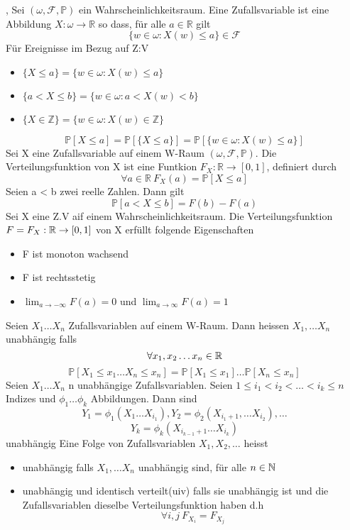 \sep
\Def[2.1 Zufallsvariable] \newline
Sei \( (\omega, \mathcal{F}, \mathbb{P})\) ein Wahrscheinlichkeitsraum. Eine Zufallsvariable ist eine Abbildung \( X : \omega \rightarrow \mathbb{R} \) so dass, für alle \( a \in \mathbb{R}\) gilt \[ \{ w \in \omega : X(w) \leq a \} \in \mathcal{F}\]
\Bem  \newline
Für Ereignisse im Bezug auf Z:V
\begin{itemize}
    \item \( \{X \leq a \} = \{ w \in \omega : X(w) \leq a\}\)
    \item \( \{ a < X \leq b \} = \{ w \in \omega : a < X(w) < b\}\)
    \item \( \{ X \in \mathbb{Z}\} = \{ w \in \omega : X(w) \in \mathbb{Z}\}\)
\end{itemize}
\[ \mathbb{P}[X \leq a] = \mathbb{P}[\{X \leq a\}] = \mathbb{P}[\{w \in \omega : X(w) \leq a\}]\]
\Def[2.2 Verteilungsfunktion] \newline
Sei X eine Zufallsvariable auf einem W-Raum \( (\omega, \mathcal{F}, \mathbb{P})\). Die Verteilungsfunktion von X ist eine Funtkion \(F_X : \mathbb{R} \rightarrow [0,1]\), definiert durch \[ \forall a \in \mathbb{R} \ F_X(a) = \mathbb{P}[X \leq a]\]
 \newline
Seien a < b zwei reelle Zahlen. Dann gilt \[ \mathbb{P}[a < X \leq b ] = F(b) - F(a)\]
 \newline
Sei X eine Z.V aif einem Wahrscheinlichkeitsraum. Die Verteilungsfunktion \( F = F_X : \mathbb{R} \rightarrow [0,1]\) von X erfüllt folgende Eigenschaften
\begin{itemize}
    \item F ist monoton wachsend
    \item F ist rechtsstetig
    \item \( \lim_{a \rightarrow -\infty} F(a) = 0 \) und \( \lim_{a \rightarrow \infty} F(a) = 1\)
\end{itemize}
\Def[2.5] \newline
Seien \( X_1 \dots X_n \) Zufallsvariablen auf einem W-Raum. Dann heissen \(X_1, \dots X_n \) unabhängig falls \[ \forall x_1, x_2 \dots x_n \in \mathbb{R} \] \[\mathbb{P}[X_1 \leq x_1 \dots X_n \leq x_n ] = \mathbb{P}[X_1 \leq x_1] \dots \mathbb{P}[X_n \leq x_n]\]
 \newline
Seien \(X_1 \dots X_n\) n unabhängige Zufallsvariablen. Seien \( 1 \leq i_1 < i_2 < \dots < i_k \leq n \) Indizes und \(\phi_1 \dots \phi_k\) Abbildungen. Dann sind  \[ Y_1 = \phi_1(X_1 \dots X_{i_1}), Y_2 = \phi_2(X_{i_{1}+1}, \dots X_{i_2}), \dots \] \[Y_k = \phi_k(X_{i_{k-1}+1} \dots X_{i_k})\] unabhängig
\Def[2.8] \newline
Eine Folge von Zufallsvariablen \(X_1, X_2, \dots \) heisst
\begin{itemize}
    \item unabhängig falls \(X_1, \dots X_n \) unabhängig sind, für alle \(n \in  \mathbb{N}\)
    \item unabhängig und identisch verteilt(uiv) falls sie unabhängig ist und die Zufallsvariablen dieselbe Verteilungsfunktion haben d.h \[ \forall i, j \ F_{X_i} = F_{X_j}\]
\end{itemize}